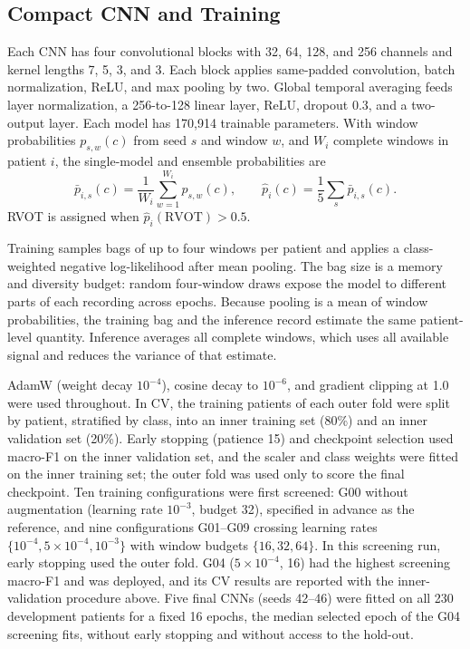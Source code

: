 \documentclass[conference,a4paper]{IEEEtran}
\begin{document}
\subsection{Compact CNN and Training}
Each CNN has four convolutional blocks with 32, 64, 128, and 256 channels and kernel lengths 7, 5, 3, and 3. Each block applies same-padded convolution, batch normalization, ReLU, and max pooling by two. Global temporal averaging feeds layer normalization, a 256-to-128 linear layer, ReLU, dropout 0.3, and a two-output layer. Each model has 170,914 trainable parameters. With window probabilities $p_{s,w}(c)$ from seed $s$ and window $w$, and $W_i$ complete windows in patient $i$, the single-model and ensemble probabilities are
\begin{equation}
\bar p_{i,s}(c)=\frac{1}{W_i}\sum_{w=1}^{W_i}p_{s,w}(c),\qquad
\hat p_i(c)=\frac{1}{5}\sum_{s}\bar p_{i,s}(c).
\label{eq:pool}
\end{equation}
RVOT is assigned when $\hat p_i(\mathrm{RVOT})>0.5$.

Training samples bags of up to four windows per patient and applies a class-weighted negative log-likelihood after mean pooling. The bag size is a memory and diversity budget: random four-window draws expose the model to different parts of each recording across epochs. Because pooling is a mean of window probabilities, the training bag and the inference record estimate the same patient-level quantity. Inference averages all complete windows, which uses all available signal and reduces the variance of that estimate.

AdamW (weight decay $10^{-4}$), cosine decay to $10^{-6}$, and gradient clipping at 1.0 were used throughout. In CV, the training patients of each outer fold were split by patient, stratified by class, into an inner training set (80\%) and an inner validation set (20\%). Early stopping (patience 15) and checkpoint selection used macro-F1 on the inner validation set, and the scaler and class weights were fitted on the inner training set; the outer fold was used only to score the final checkpoint. Ten training configurations were first screened: G00 without augmentation (learning rate $10^{-3}$, budget 32), specified in advance as the reference, and nine configurations G01--G09 crossing learning rates $\{10^{-4},5\times10^{-4},10^{-3}\}$ with window budgets $\{16,32,64\}$. In this screening run, early stopping used the outer fold. G04 ($5\times10^{-4}$, 16) had the highest screening macro-F1 and was deployed, and its CV results are reported with the inner-validation procedure above. Five final CNNs (seeds 42--46) were fitted on all 230 development patients for a fixed 16 epochs, the median selected epoch of the G04 screening fits, without early stopping and without access to the hold-out.
\end{document}
